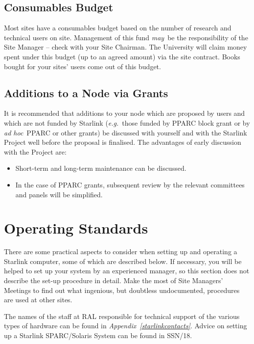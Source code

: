 \documentclass[twoside,11pt]{article}
\newcommand{\xref}[3]{#1}
\begin{document}
\subsection{Consumables Budget}

Most sites have a consumables budget based on the number of research
and technical users on site.
Management of this fund {\em may}\, be the responsibility of the Site Manager --
check with your Site Chairman.
The University will claim money spent under this budget (up to an agreed
amount) via the site contract.
Books bought for your sites' users come out of this budget.

\subsection {Additions to a Node via Grants}

It is recommended that additions to your node which are proposed by users and
which are not funded by Starlink ({\em e.g.}\, those funded by PPARC block
grant or by {\em ad hoc}\, PPARC or other grants) be discussed with yourself
and with the Starlink Project well before the proposal is finalised.
The advantages of early discussion with the Project are:

\begin{itemize}
\item Short-term and long-term maintenance can be discussed.
\item In the case of PPARC grants, subsequent review by the relevant 
 committees and panels will be simplified.
\end{itemize}

\newpage

\section{\label{operatingstandards}Operating Standards}

There are some practical aspects to consider when setting up and operating a
Starlink computer, some of which are described below.
If necessary, you will be helped to set up your system by an experienced
manager, so this section does not describe the set-up procedure in detail.
Make the most of Site Managers' Meetings to find out what ingenious, but
doubtless undocumented, procedures are used at other sites.

The names of the staff at RAL responsible for technical support
of the various types of hardware can be found in
{\em Appendix~\ref{starlinkcontacts}}.
Advice on setting up a Starlink SPARC/Solaris System can be found in
\xref{SSN/18}{ssn18}{}. 
\end{document}
